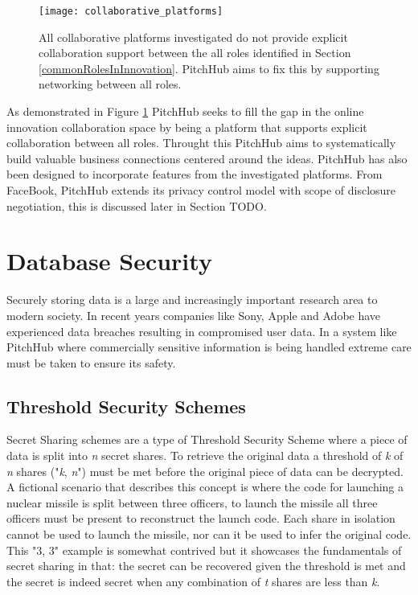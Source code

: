 \begin{figure}[ht]
    \centering
    \texttt{[image: collaborative\_platforms]}
    \caption{All collaborative platforms investigated do not provide explicit collaboration support between the all roles identified in Section \ref{commonRolesInInnovation}. PitchHub aims to fix this by supporting networking between all roles. }
    \label{fig:collaborative_platforms}
\end{figure}

As demonstrated in Figure \ref{fig:collaborative_platforms} PitchHub seeks to fill the gap in the online innovation collaboration space by being a platform that supports explicit collaboration between all roles. Throught this PitchHub aims to systematically build valuable business connections centered around the ideas. PitchHub has also been designed to incorporate features from the investigated platforms. From FaceBook, PitchHub extends its privacy control model with scope of disclosure negotiation, this is discussed later in Section TODO.

\section{Database Security}
Securely storing data is a large and increasingly important research area to modern society. In recent years companies like Sony, Apple and Adobe have experienced data breaches resulting in compromised user data. In a system like PitchHub where commercially sensitive information is being handled extreme care must be taken to ensure its safety.

\subsection{Threshold Security Schemes}
Secret Sharing schemes are a type of Threshold Security Scheme where a piece of data is split into \textit{n} secret shares. To retrieve the original data a threshold of \textit{k} of \textit{n} shares ("\textit{k}, \textit{n}") must be met before the original piece of data can be decrypted. A fictional scenario that describes this concept is where the code for launching a nuclear missile is split between three officers, to launch the missile all three officers must be present to reconstruct the launch code. Each share in isolation cannot be used to launch the missile, nor can it be used to infer the original code. This "3, 3" example is somewhat contrived but it showcases the fundamentals of secret sharing in that: the secret can be recovered given the threshold is met and the secret is indeed secret when any combination of \textit{t} shares are less than \textit{k}.

